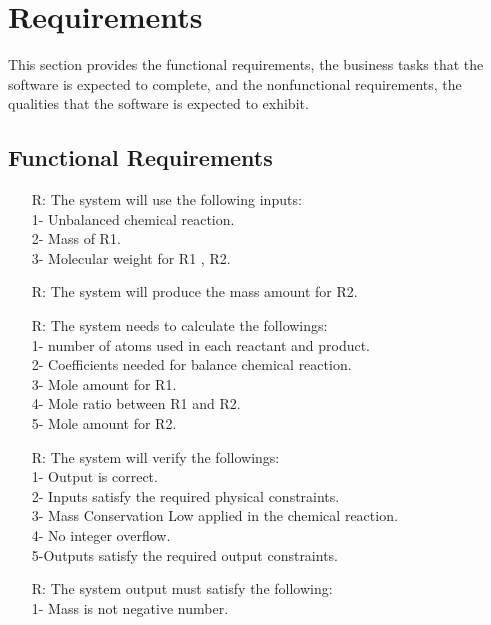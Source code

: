 \documentclass[12pt]{article}
\newcounter{reqnum} %
\begin{document}
\section{Requirements}

This section provides the functional requirements, the business tasks that the
software is expected to complete, and the nonfunctional requirements, the
qualities that the software is expected to exhibit.

\subsection{Functional Requirements}

\noindent \begin{itemize}

\item[R\refstepcounter{reqnum}\thereqnum \label{R_Inputs}:] The system will use the following inputs:\\
1- Unbalanced chemical reaction.\\
2- Mass of R1.\\
3- Molecular weight for R1 , R2.\\


\item[R\refstepcounter{reqnum}\thereqnum \label{R_OutputInputs}:]  The system will produce the mass amount for R2. \\

\item[R\refstepcounter{reqnum}\thereqnum \label{R_Calculate}:] The system needs to calculate the followings:\\
1- number of atoms used in each reactant and product.\\
2- Coefficients needed for balance chemical reaction.\\
3- Mole  amount for R1.\\
4- Mole ratio between R1 and R2.\\
5- Mole amount for R2.\\
\item[R\refstepcounter{reqnum}\thereqnum \label{R_VerifyOutput}:] The system will verify the followings:\\
1- Output is correct.\\
2-  Inputs satisfy the required physical constraints.\\
3- Mass Conservation Low applied in the chemical reaction.\\
4- No integer overflow. \\
5-Outputs satisfy the required output constraints.\\

\item[R\refstepcounter{reqnum}\thereqnum \label{R_Output}:] The system output must satisfy the following:\\
   
1- Mass is not negative number.\\

\end{itemize}
\end{document}

